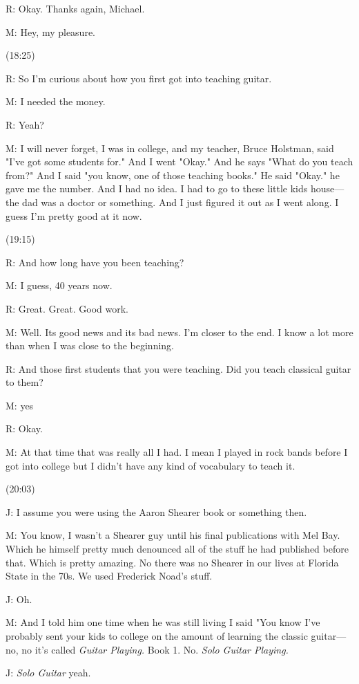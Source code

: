 \documentclass[11pt]{article}
\begin{document}
R: Okay. Thanks again, Michael.

M: Hey, my pleasure.

(18:25)

R: So I'm curious about how you first got into teaching guitar.

M: I needed the money.

R: Yeah?

M: I will never forget, I was in college, and my teacher, Bruce Holstman, said "I've got some students for." And I went "Okay." And he says "What do you teach from?" And I said "you know, one of those teaching books." He said "Okay." he gave me the number. And I had no idea. I had to go to these little kids house---the dad was a doctor or something. And I just figured it out as I went along. I guess I'm pretty good at it now. 

(19:15)

R: And how long have you been teaching?

M: I guess, 40 years now. 

R: Great. Great. Good work. 

M: Well. Its good news and its bad news. I'm closer to the end. I know a lot more than when I was close to the beginning. 

R: And those first students that you were teaching. Did you teach classical guitar to them?

M: yes

R: Okay.

M: At that time that was really all I had. I mean I played in rock bands before I got into college but I didn't have any kind of vocabulary to teach it. 

(20:03)

J: I assume you were using the Aaron Shearer book or something then.

M: You know, I wasn't a Shearer guy until his final publications with Mel Bay. Which he himself pretty much denounced all of the stuff he had published before that. Which is pretty amazing. No there was no Shearer in our lives at Florida State in the 70s. We used Frederick Noad's stuff. 

J: Oh. 

M: And I told him one time when he was still living I said "You know I've probably sent your kids to college on the amount of learning the classic guitar---no, no it's called \emph{Guitar Playing.} Book 1. No. \emph{Solo Guitar Playing.}

J: \emph{Solo Guitar} yeah. 
\end{document}
